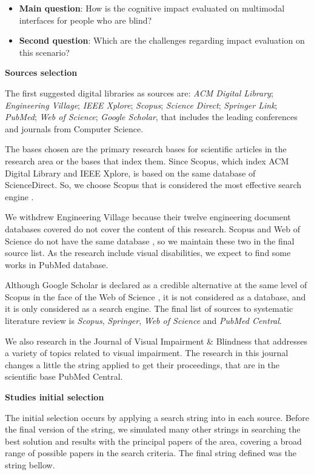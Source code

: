     \begin{itemize}
        \item \textbf{Main question}: How is the cognitive impact evaluated on multimodal interfaces for people who are blind?

        \item \textbf{Second question}: Which are the challenges regarding impact evaluation on this scenario?
    \end{itemize}
    
\textbf{Sources selection}

The first suggested digital libraries as sources are: \textit{ACM Digital Library}; \textit{Engineering Village}; \textit{IEEE Xplore}; \textit{Scopus}; \textit{Science Direct}; \textit{Springer Link}; \textit{PubMed}; \textit{Web of Science}; \textit{Google Scholar}, that includes the leading conferences and journals from Computer Science.

The bases chosen are the primary research bases for scientific articles in the research area or the bases that index them. Since Scopus, which index ACM Digital Library and IEEE Xplore, is based on the same database of ScienceDirect. So, we choose Scopus that is considered the most effective search engine \cite{Burnham2006}. 

We withdrew Engineering Village because their twelve engineering document databases covered do not cover the content of this research. Scopus and Web of Science do not have the same database \cite{Tober2011}, so we maintain these two in the final source list. As the research include visual disabilities, we expect to find some works in PubMed database.

Although Google Scholar is declared as a credible alternative at the same level of Scopus in the face of the Web of Science \cite{Harzing2016}, it is not considered as a database, and it is only considered as a search engine. The final list of sources to systematic literature review is \textit{Scopus}, \textit{Springer}, \textit{Web of Science} and \textit{PubMed Central}.

We also research in the Journal of Visual Impairment \& Blindness that addresses a variety of topics related to visual impairment. The research in this journal changes a little the string applied to get their proceedings, that are in the scientific base PubMed Central.

\textbf{Studies initial selection}

The initial selection occurs by applying a search string into in each source. Before the final version of the string, we simulated many other strings in searching the best solution and results with the principal papers of the area, covering a broad range of possible papers in the search criteria. The final string defined was the string bellow.

